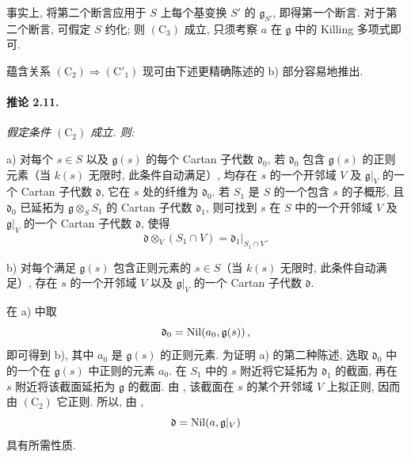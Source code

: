 事实上, 将第二个断言应用于 \(S\) 上每个基变换 \(S'\) 的 \(\mathfrak g_{S'}\), 即得第一个断言. 对于第二个断言, 可假定 \(S\) 约化; 则 \((\mathrm C_3)\) 成立, 只须考察 \(a\) 在 \(\mathfrak g\) 中的 Killing 多项式即可.

蕴含关系 \((\mathrm C_2)\Longrightarrow(\mathrm C'_1)\) 现可由下述更精确陈述的 b) 部分容易地推出.

\paragraph{\textbf{推论 2.11.}}
{\itshape 假定条件 \((\mathrm C_2)\) 成立. 则:

\smallskip
\noindent
\textup{a)}
对每个 \(s\in S\) 以及 \(\mathfrak g(s)\) 的每个 Cartan 子代数 \(\mathfrak d_0\), 若 \(\mathfrak d_0\) 包含 \(\mathfrak g(s)\) 的正则元素\textup{（当 \(k(s)\) 无限时, 此条件自动满足）}, 均存在 \(s\) 的一个开邻域 \(V\) 及 \(\mathfrak g|_V\) 的一个 Cartan 子代数 \(\mathfrak d\), 它在 \(s\) 处的纤维为 \(\mathfrak d_0\). 若 \(S_1\) 是 \(S\) 的一个包含 \(s\) 的子概形, 且 \(\mathfrak d_0\) 已延拓为 \(\mathfrak g\otimes_S S_1\) 的 Cartan 子代数 \(\mathfrak d_1\), 则可找到 \(s\) 在 \(S\) 中的一个开邻域 \(V\) 及 \(\mathfrak g|_V\) 的一个 Cartan 子代数 \(\mathfrak d\), 使得
\[
  \mathfrak d\otimes_V(S_1\cap V)
  =\mathfrak d_1|_{S_1\cap V}.
\]

\smallskip
\noindent
\textup{b)}
对每个满足 \(\mathfrak g(s)\) 包含正则元素的 \(s\in S\)\textup{（当 \(k(s)\) 无限时, 此条件自动满足）}, 存在 \(s\) 的一个开邻域 \(V\) 以及 \(\mathfrak g|_V\) 的一个 Cartan 子代数 \(\mathfrak d\).}

在 a) 中取
\[
  \mathfrak d_0=\operatorname{Nil}\!\left(a_0,\mathfrak g(s)\right),
\]
即可得到 b), 其中 \(a_0\) 是 \(\mathfrak g(s)\) 的正则元素.
为证明 a) 的第二种陈述, 选取 \(\mathfrak d_0\) 中的一个在 \(\mathfrak g(s)\) 中正则的元素 \(a_0\). 在 \(S_1\) 中的 \(s\) 附近将它延拓为 \(\mathfrak d_1\) 的截面, 再在 \(s\) 附近将该截面延拓为 \(\mathfrak g\) 的截面. 由 , 该截面在 \(s\) 的某个开邻域 \(V\) 上拟正则, 因而由 \((\mathrm C_2)\) 它正则. 所以, 由 ,
\[
  \mathfrak d=\operatorname{Nil}\!\left(a,\mathfrak g|_V\right)
\]
具有所需性质.



